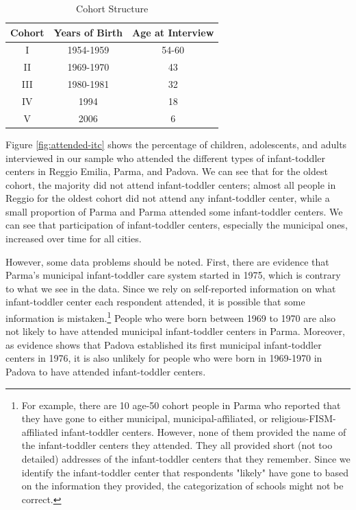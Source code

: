 \begin{table}[H] \caption{Cohort Structure} \label{tab:cohort-structure}
\begin{tabular}{ccc}
\toprule
Cohort & Years of Birth & Age at Interview \\ \midrule
I 	   & 1954-1959 		& 54-60 \\
II 	   & 1969-1970		& 43	\\
III    & 1980-1981		& 32    \\
IV 	   & 1994			& 18 	\\
V 	   & 2006			& 6 \\ 
\bottomrule 
\end{tabular}
\end{table}

Figure \ref{fig:attended-itc} shows the percentage of children, adolescents, and adults interviewed in our sample who attended the different types of infant-toddler centers in Reggio Emilia, Parma, and Padova. We can see that for the oldest cohort, the majority did not attend infant-toddler centers; almost all people in Reggio for the oldest cohort did not attend any infant-toddler center, while a small proportion of Parma and Parma attended some infant-toddler centers. We can see that participation of infant-toddler centers, especially the municipal ones, increased over time for all cities.

However, some data problems should be noted. First, there are evidence that Parma's municipal infant-toddler care system started in 1975, which is contrary to what we see in the data. Since we rely on self-reported information on what infant-toddler center each respondent attended, it is possible that some information is mistaken.\footnote{For example, there are 10 age-50 cohort people in Parma who reported that they have gone to either municipal, municipal-affiliated, or religious-FISM-affiliated infant-toddler centers. However, none of them provided the name of the infant-toddler centers they attended. They all provided short (not too detailed) addresses of the infant-toddler centers that they remember. Since we identify the infant-toddler center that respondents "likely" have gone to based on the information they provided, the categorization of schools might not be correct.} People who were born between 1969 to 1970 are also not likely to have attended municipal infant-toddler centers in Parma. Moreover, as evidence shows that Padova established its first municipal infant-toddler centers in 1976, it is also unlikely for people who were born in 1969-1970 in Padova to have attended infant-toddler centers. 

